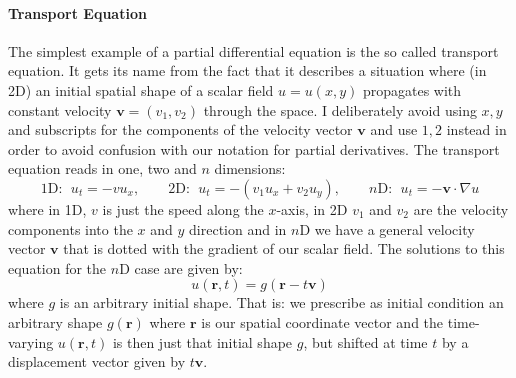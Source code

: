 \paragraph{Transport Equation} 
The simplest example of a partial differential equation is the so called transport equation. It gets its name from the fact that it describes a situation where (in 2D) an initial spatial shape of a scalar field $u = u(x,y)$ propagates with constant velocity $\mathbf{v} = (v_1, v_2)$ through the space. I deliberately avoid using $x,y$ and subscripts for the components of the velocity vector $\mathbf{v}$ and use $1,2$ instead in order to avoid confusion with our notation for partial derivatives. The transport equation reads in one, two and $n$ dimensions:
\begin{equation}
1\text{D: } \; u_t = - v u_x , \qquad 
2\text{D: } \; u_t = - (v_1 u_x + v_2 u_y), \qquad 
n\text{D: } \; u_t = - \mathbf{v} \cdot \nabla u
\end{equation}
where in 1D, $v$ is just the speed along the $x$-axis, in 2D $v_1$ and $v_2$ are the velocity components into the $x$ and $y$ direction and in $n$D we have a general velocity vector $\mathbf{v}$ that is dotted with the gradient of our scalar field. The solutions to this equation for the $n$D case are given by:
\begin{equation}
u(\mathbf{r}, t) = g(\mathbf{r} - t \mathbf{v})
\end{equation}
where $g$ is an arbitrary initial shape. That is: we prescribe as initial condition an arbitrary shape $g(\mathbf{r})$ where $\mathbf{r}$ is our spatial coordinate vector and the time-varying $u(\mathbf{r}, t)$ is then just that initial shape $g$, but shifted at time $t$ by a displacement vector given by $t \mathbf{v}$.



